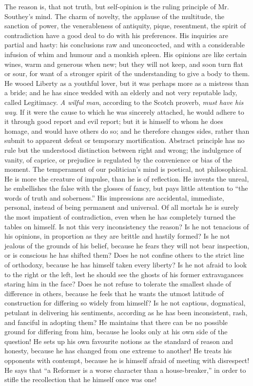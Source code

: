The reason is, that not truth, but self-opinion is the ruling
principle of Mr. Southey's mind. The charm of novelty, the
applause of the multitude, the sanction of power, the
venerableness of antiquity, pique, resentment, the spirit of
contradiction have a good deal to do with his preferences. His
inquiries are partial and hasty: his conclusions raw and
unconcocted, and with a considerable infusion of whim and humour
and a monkish spleen. His opinions are like certain wines, warm
and generous when new; but they will not keep, and soon turn flat
or sour, for want of a stronger spirit of the understanding to
give a body to them. He wooed Liberty as a youthful lover, but it
was perhaps more as a mistress than a bride; and he has since
wedded with an elderly and not very reputable lady, called
Legitimacy. \emph{A wilful man}, according to the Scotch proverb,
\emph{must have his way}. If it were the cause to which he was
sincerely attached, he would adhere to it through good report and
evil report; but it is himself to whom he does homage, and would
have others do so; and he therefore changes sides, rather than
submit to apparent defeat or temporary mortification. Abstract
principle has no rule but the understood distinction between right
and wrong; the indulgence of vanity, of caprice, or prejudice is
regulated by the convenience or bias of the moment. The
temperament of our politician's mind is poetical, not
philosophical. He is more the creature of impulse, than he is of
reflection. He invents the unreal, he embellishes the false with
the glosses of fancy, but pays little attention to ``the words of
truth and soberness.'' His impressions are accidental, immediate,
personal, instead of being permanent and universal. Of all mortals
he is surely the most impatient of contradiction, even when he has
completely turned the tables on himself. Is not this very
inconsistency the reason?  Is he not tenacious of his opinions, in
proportion as they are brittle and hastily formed? Is he not
jealous of the grounds of his belief, because he fears they will
not bear inspection, or is conscious he has shifted them? Does he
not confine others to the strict line of orthodoxy, because he has
himself taken every liberty? Is he not afraid to look to the right
or the left, lest he should see the ghosts of his former
extravagances staring him in the face? Does he not refuse to
tolerate the smallest shade of difference in others, because he
feels that he wants the utmost latitude of construction for
differing so widely from himself? Is he not captious, dogmatical,
petulant in delivering his sentiments, according as he has been
inconsistent, rash, and fanciful in adopting them? He maintains
that there can be no possible ground for differing from him,
because he looks only at his own side of the question! He sets up
his own favourite notions as the standard of reason and honesty,
because he has changed from one extreme to another! He treats his
opponents with contempt, because he is himself afraid of meeting
with disrespect! He says that ``a Reformer is a worse character
than a house-breaker,'' in order to stifle the recollection that
he himself once was one!

